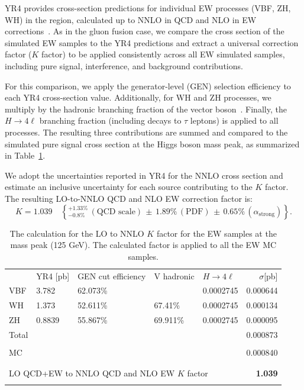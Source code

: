 YR4 provides cross-section predictions for individual EW processes (VBF, ZH, WH) in the \onshell region, calculated up to NNLO in QCD and NLO in EW corrections~\cite{YellowRep4}. As in the gluon fusion case, we compare the \onshell cross section of the simulated EW samples to the YR4 predictions and extract a universal correction factor ($K$ factor) to be applied consistently across all EW simulated samples, including pure signal, interference, and background contributions.

For this comparison, we apply the generator-level (GEN) selection efficiency to each YR4 cross-section value. Additionally, for WH and ZH processes, we multiply by the hadronic branching fraction of the vector boson~\cite{Zyla:2020zbs}. Finally, the $H \to 4\ell$ branching fraction (including decays to $\tau$ leptons) is applied to all processes. The resulting three contributions are summed and compared to the simulated pure signal cross section at the Higgs boson mass peak, as summarized in Table~\ref{tab:ew_YR4}.

We adopt the uncertainties reported in YR4 for the NNLO cross section and estimate an inclusive uncertainty for each source contributing to the $K$ factor. The resulting LO-to-NNLO QCD and NLO EW correction factor is:
\[
K = \mathbf{1.039} \quad \left\{{}^{+1.33\%}_{-0.8\%} \,(\text{QCD scale}) \,\pm\, 1.89\% \,(\text{PDF}) \,\pm\, 0.65\%\, (\alpha_\text{strong}) \right\}.
\]

\begin{table}[!hbt]
\begin{center}
\small
\begin{tabular}{lllllr}
\vspace{-0.2cm} \\
\hline
    & YR4 [pb]    & GEN cut efficiency  & V hadronic & $H\to4\ell$ & $\sigma $[pb]   \\
\hline
VBF & 3.782    & 62.073\% &    & 0.0002745 &  0.000644  \\
WH  & 1.373    & 52.611\% & 67.41\%  & 0.0002745 &  0.000134 \\
ZH  & 0.8839   & 55.867\% & 69.911\%   & 0.0002745 &  0.000095  \\
Total  &          &          &           &           &  0.000873  \\
\vspace{-0.2cm} \\
MC   &          &          &           &           &  0.000840 \\
\vspace{-0.2cm} \\
\hline
\vspace{-0.2cm} \\
\multicolumn{5}{l}{LO QCD+EW to NNLO QCD and NLO EW $K$ factor} &  \textbf{1.039} \\
\vspace{-0.2cm} \\
\hline
\end{tabular}
\caption{The calculation for the LO to NNLO $K$ factor for the EW \offshell samples at the \Hboson mass peak (125 GeV). 
The calculated factor is applied to all the \offshell EW MC samples.
\label{tab:ew_YR4}}
\end{center}
\end{table}

